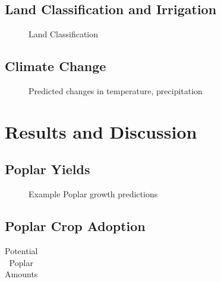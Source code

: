 \documentclass[preprint,12pt]{elsarticle}
\begin{document}
\subsection{Land Classification and Irrigation}
\label{sec:land}

\begin{figure}[hp]
  \centering
  
  \caption{Land Classification}
  \label{fig:land}
\end{figure}


\subsection{Climate Change}
\label{sec:climate}

\begin{figure}[hp]
  \centering
  
  \caption{Predicted changes in temperature, precipitation }
  \label{fig:temp}
\end{figure}


\section{Results and Discussion}

\subsection{Poplar Yields}
\label{sec:yield}

\begin{figure}[hp]
  \centering
  
  \caption{Example Poplar growth predictions}
  \label{fig:examples}
\end{figure}



\subsection{Poplar Crop Adoption}
\label{sec:bcam-out}

\begin{table}[hp]
  \centering
  \begin{tabular}{|l|c|c|}
    
  \end{tabular}
  \caption{Potential Poplar Amounts}
  \label{tab:potential}
\end{table}
\end{document}
